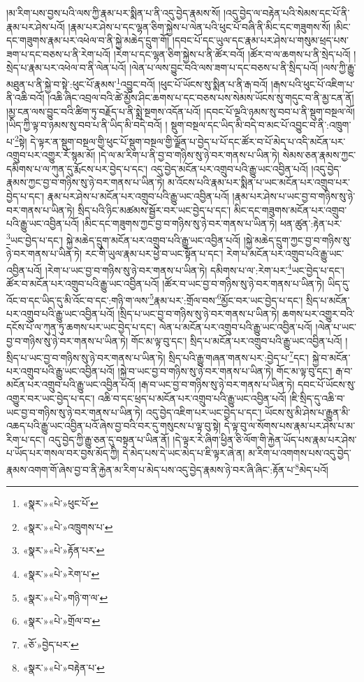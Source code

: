 །མ་རིག་པས་བྱས་པའི་ལས་ཀྱི་རྣམ་པར་སྨིན་པ་ནི་འདུ་བྱེད་རྣམས་སོ། །འདུ་བྱེད་ལ་བརྟེན་པའི་སེམས་དང་པོ་ནི་རྣམ་པར་ཤེས་པའོ། །རྣམ་པར་ཤེས་པ་དང་ལྷན་ཅིག་སྐྱེས་པ་ལེན་པའི་ཕུང་པོ་བཞི་ནི་མིང་དང་གཟུགས་སོ། །མིང་དང་གཟུགས་རྣམ་པར་འཕེལ་བ་ནི་སྐྱེ་མཆེད་དྲུག་གོ། །དབང་པོ་དང་ཡུལ་དང་རྣམ་པར་ཤེས་པ་གསུམ་ཕྲད་པས་ཟག་པ་དང་བཅས་པ་ནི་རེག་པའོ། །རེག་པ་དང་ལྷན་ཅིག་སྐྱེས་པ་ནི་ཚོར་བའོ། །ཚོར་བ་ལ་ཆགས་པ་ནི་སྲེད་པའོ། །སྲེད་པ་རྣམ་པར་འཕེལ་བ་ནི་ལེན་པའོ། །ལེན་པ་ལས་བྱུང་བའི་ལས་ཟག་པ་དང་བཅས་པ་ནི་སྲིད་པའོ། །ལས་ཀྱི་རྒྱུ་མཐུན་པ་ནི་སྐྱེ་བ་སྟེ་:ཕུང་པོ་རྣམས་\footnote{«སྣར་»«པེ་»ཕུང་པོ་}འབྱུང་བའོ། །ཕུང་པོ་ཡོངས་སུ་སྨིན་པ་ནི་རྒ་བའོ། །རྒས་པའི་ཕུང་པོ་འཇིག་པ་ནི་འཆི་བའོ། །འཆི་ཞིང་འབྲལ་བའི་ཚེ་མྱོས་ཤིང་ཆགས་པ་དང་བཅས་པས་སེམས་ཡོངས་སུ་གདུང་བ་ནི་མྱ་ངན་ནོ། །མྱ་ངན་ལས་བྱུང་བའི་ཚིག་ཏུ་བརྗོད་པ་ནི་སྨྲེ་སྔགས་འདོན་པའོ། །དབང་པོ་ལྔའི་ཉམས་སུ་བབ་པ་ནི་སྡུག་བསྔལ་ལོ། །ཡིད་ཀྱི་ལྟ་བ་ཉམས་སུ་བབ་པ་ནི་ཡིད་མི་བདེ་བའོ། །
སྡུག་བསྔལ་དང་ཡིད་མི་བདེ་བ་མང་པོ་འབྱུང་བ་ནི་:འཁྲུག་པ་\footnote{«སྣར་»«པེ་»འཁྲུགས་པ་}སྟེ། དེ་ལྟར་ན་སྡུག་བསྔལ་གྱི་ཕུང་པོ་སྡུག་བསྔལ་གྱི་ལྗོན་པ་བྱེད་པ་པོ་དང་ཚོར་བ་པོ་མེད་པ་འདི་མངོན་པར་འགྲུབ་པར་འགྱུར་རོ་སྙམ་མོ། །དེ་ལ་མ་རིག་པ་ནི་བྱ་བ་གཉིས་སུ་ཉེ་བར་གནས་པ་ཡིན་ཏེ། སེམས་ཅན་རྣམས་ཀྱང་དམིགས་པ་ལ་ཀུན་དུ་རྨོངས་པར་བྱེད་པ་དང་། འདུ་བྱེད་མངོན་པར་འགྲུབ་པའི་རྒྱུ་ཡང་འབྱིན་པའོ། །འདུ་བྱེད་རྣམས་ཀྱང་བྱ་བ་གཉིས་སུ་ཉེ་བར་གནས་པ་ཡིན་ཏེ། མ་འོངས་པའི་རྣམ་པར་སྨིན་པ་ཡང་མངོན་པར་འགྲུབ་པར་བྱེད་པ་དང་། རྣམ་པར་ཤེས་པ་མངོན་པར་འགྲུབ་པའི་རྒྱུ་ཡང་འབྱིན་པའོ། །རྣམ་པར་ཤེས་པ་ཡང་བྱ་བ་གཉིས་སུ་ཉེ་བར་གནས་པ་ཡིན་ཏེ། སྲིད་པའི་ཉིང་མཚམས་སྦྱོར་བར་ཡང་བྱེད་པ་དང་། མིང་དང་གཟུགས་མངོན་པར་འགྲུབ་པའི་རྒྱུ་ཡང་འབྱིན་པའོ། །མིང་དང་གཟུགས་ཀྱང་བྱ་བ་གཉིས་སུ་ཉེ་བར་གནས་པ་ཡིན་ཏེ། ཕན་ཚུན་:རྟེན་པར་\footnote{«སྣར་»«པེ་»རྟོན་པར་}ཡང་བྱེད་པ་དང་། སྐྱེ་མཆེད་དྲུག་མངོན་པར་འགྲུབ་པའི་རྒྱུ་ཡང་འབྱིན་པའོ། །སྐྱེ་མཆེད་དྲུག་ཀྱང་བྱ་བ་གཉིས་སུ་ཉེ་བར་གནས་པ་ཡིན་ཏེ། རང་གི་ཡུལ་རྣམ་པར་ཕྱེ་བ་ཡང་སྟོན་པ་དང་། རེག་པ་མངོན་པར་འགྲུབ་པའི་རྒྱུ་ཡང་འབྱིན་པའོ། །རེག་པ་ཡང་བྱ་བ་གཉིས་སུ་ཉེ་བར་གནས་པ་ཡིན་ཏེ། དམིགས་པ་ལ་:རེག་པར་\footnote{«སྣར་»«པེ་»རེག་པ་}ཡང་བྱེད་པ་དང་། ཚོར་བ་མངོན་པར་འགྲུབ་པའི་རྒྱུ་ཡང་འབྱིན་པའོ། །ཚོར་བ་ཡང་བྱ་བ་གཉིས་སུ་ཉེ་བར་གནས་པ་ཡིན་ཏེ། ཡིད་དུ་འོང་བ་དང་ཡིད་དུ་མི་འོང་བ་དང་:གཉི་ག་ལས་\footnote{«སྣར་»«པེ་»གཉི་ག་ལ་}རྣམ་པར་:གྲོལ་བས་\footnote{«སྣར་»«པེ་»གྲོལ་བ་}མྱོང་བར་ཡང་བྱེད་པ་དང་། སྲིད་པ་མངོན་པར་འགྲུབ་པའི་རྒྱུ་ཡང་འབྱིན་པའོ། །སྲིད་པ་ཡང་བྱ་བ་གཉིས་སུ་ཉེ་བར་གནས་པ་ཡིན་ཏེ། ཆགས་པར་འགྱུར་བའི་དངོས་པོ་ལ་ཀུན་ཏུ་ཆགས་པར་ཡང་བྱེད་པ་དང་། ལེན་པ་མངོན་པར་འགྲུབ་པའི་རྒྱུ་ཡང་འབྱིན་པའོ། །ལེན་པ་ཡང་བྱ་བ་གཉིས་སུ་ཉེ་བར་གནས་པ་ཡིན་ཏེ། གོང་མ་ལྟ་བུ་དང་། སྲིད་པ་མངོན་པར་འགྲུབ་པའི་རྒྱུ་ཡང་འབྱིན་པའོ། །སྲིད་པ་ཡང་བྱ་བ་གཉིས་སུ་ཉེ་བར་གནས་པ་ཡིན་ཏེ། སྲིད་པའི་རྒྱུ་གཞན་གནས་པར་:བྱེད་པ་\footnote{«ཅོ་»བྱེད་པར་}དང་། སྐྱེ་བ་མངོན་པར་འགྲུབ་པའི་རྒྱུ་ཡང་འབྱིན་པའོ། །སྐྱེ་བ་ཡང་བྱ་བ་གཉིས་སུ་ཉེ་བར་གནས་པ་ཡིན་ཏེ། གོང་མ་ལྟ་བུ་དང་། རྒ་བ་མངོན་པར་འགྲུབ་པའི་རྒྱུ་ཡང་འབྱིན་པའོ། །རྒ་བ་ཡང་བྱ་བ་གཉིས་སུ་ཉེ་བར་གནས་པ་ཡིན་ཏེ། དབང་པོ་ཡོངས་སུ་འགྱུར་བར་ཡང་བྱེད་པ་དང་། འཆི་བ་དང་ཕྲད་པ་མངོན་པར་འགྲུབ་པའི་རྒྱུ་ཡང་འབྱིན་པའོ། །ཇི་སྲིད་དུ་འཆི་བ་ཡང་བྱ་བ་གཉིས་སུ་ཉེ་བར་གནས་པ་ཡིན་ཏེ། འདུ་བྱེད་འཇིག་པར་ཡང་བྱེད་པ་དང་། ཡོངས་སུ་མི་ཤེས་པ་རྒྱུན་མི་འཆད་པའི་རྒྱུ་ཡང་འབྱིན་པའོ་ཞེས་བྱ་བའི་བར་དུ་གསུངས་པ་ལྟ་བུ་སྟེ། དེ་ལྟ་བུ་ལ་སོགས་པས་རྣམ་པར་ཤེས་པ་མ་རིག་པ་དང་། འདུ་བྱེད་ཀྱི་རྒྱུ་ཅན་དུ་བསྟན་པ་ཡིན་ནོ། །དེ་ལྟར་རེ་ཞིག་ཕྱིན་ཅི་ལོག་གི་རྐྱེན་ཡོད་པས་རྣམ་པར་ཤེས་པ་ཡོད་པར་གསལ་བར་བྱས་མོད་ཀྱི། དེ་མེད་པས་དེ་ཡང་མེད་པ་ཇི་ལྟར་ཞེ་ན། མ་རིག་པ་འགགས་པས་འདུ་བྱེད་རྣམས་འགག་གོ་ཞེས་བྱ་བ་ནི་རྐྱེན་མ་རིག་པ་མེད་པས་འདུ་བྱེད་རྣམས་ཉེ་བར་ཞི་ཞིང་:རྟོན་པ་\footnote{«སྣར་»«པེ་»བརྟེན་པ་}མེད་པའོ། 